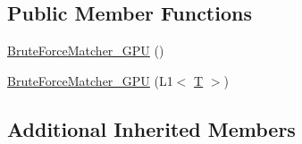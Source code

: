 \subsection*{Public Member Functions}
\begin{DoxyCompactItemize}
\item 
\hyperlink{classcv_1_1gpu_1_1BruteForceMatcher__GPU_3_01L1_3_01T_01_4_01_4_ac74716db9af9644b21b39db9b0949835}{Brute\-Force\-Matcher\-\_\-\-G\-P\-U} ()
\item 
\hyperlink{classcv_1_1gpu_1_1BruteForceMatcher__GPU_3_01L1_3_01T_01_4_01_4_a1c185e92023f43091a80cd8387ba2ad9}{Brute\-Force\-Matcher\-\_\-\-G\-P\-U} (L1$<$ \hyperlink{calib3d_8hpp_a3efb9551a871ddd0463079a808916717}{T} $>$)
\end{DoxyCompactItemize}
\subsection*{Additional Inherited Members}


